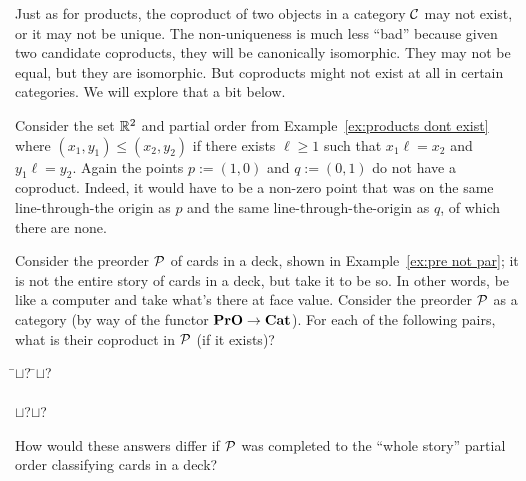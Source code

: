 \documentclass[CT4S-EN-RU]{subfiles}
\begin{document}
\begin{exampleRUS}
\end{exampleRUS}

\begin{blockENG}
Just as for products, the coproduct of two objects in a category $\mathcal{C}$ may not exist, or it may not be unique. The non-uniqueness is much less “bad” because given two candidate coproducts, they will be canonically isomorphic. They may not be equal, but they are isomorphic. But coproducts might not exist at all in certain categories. We will explore that a bit below.
\end{blockENG}

\begin{blockRUS}
\end{blockRUS}

\begin{exampleENG}
Consider the set ${\mathbb R}^2$ and partial order from Example~\ref{ex:products dont exist} where $(x_1,y_1)\leq (x_2,y_2)$ if there exists $\ell\geq 1$ such that $x_1\ell=x_2$ and $y_1\ell=y_2$. Again the points $p:=(1,0)$ and $q:=(0,1)$ do not have a coproduct. Indeed, it would have to be a non-zero point that was on the same line-through-the origin as $p$ and the same line-through-the-origin as $q$, of which there are none.
\end{exampleENG}

\begin{exampleRUS}
\end{exampleRUS}

\begin{exerciseENG}
Consider the preorder $\mathcal{P}$ of cards in a deck, shown in Example~\ref{ex:pre not par}; it is not the entire story of cards in a deck, but take it to be so. In other words, be like a computer and take what's there at face value. Consider the preorder $\mathcal{P}$ as a category (by way of the functor ${\mathbf{PrO}}\rightarrow{\mathbf{Cat}}$). For each of the following pairs, what is their coproduct in $\mathcal{P}$ (if it exists)?
\sexc 
\begin{tabbing}
\hspace{.5in}\= $\sqcup$\;?\hspace{.5in} \=$\sqcup$\;?\\\\
\> $\sqcup$\;?\>$\sqcup$\;?
\end{tabbing}
\item How would these answers differ if $\mathcal{P}$ was completed to the “whole story” partial order classifying cards in a deck?
\endsexc
\end{exerciseENG}
\end{document}
